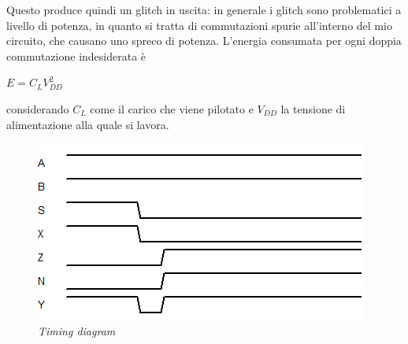 Questo produce quindi un glitch in uscita: in generale i glitch sono problematici a livello di potenza, in quanto si tratta di commutazioni spurie all'interno del mio circuito, che causano uno spreco di potenza. L'energia consumata per ogni doppia commutazione indesiderata è
\begin{center}
	$ E=C_{L}V_{DD}^{2}$
\end{center}
considerando $C_{L}$ come il carico che viene pilotato e $V_{DD}$ la tensione di alimentazione alla quale si lavora. 
\begin{figure}[!htb]
	\centering
	\includegraphics[scale=0.6]{immagini/timing_mux}
	\caption{\textit{Timing diagram }}
	\label{timing_mux}
\end{figure}
